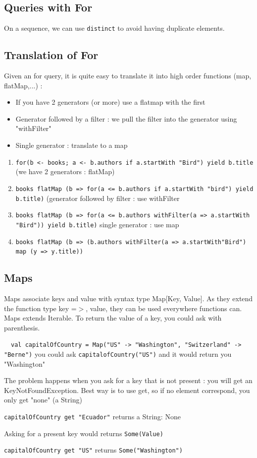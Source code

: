 \documentclass[12pt,a4paper]{article}
\begin{document}
\subsection{Queries with For}
On a sequence, we can use \texttt{distinct} to avoid having duplicate elements.

\subsection{Translation of For}
Given an for query, it is quite easy to translate it into high order functions (map, flatMap,...) :
\begin{itemize}
	\item 	If you have 2 generators (or more) use a flatmap with the first
	\item	Generator followed by a filter : we pull the filter into the generator using "withFilter"
	\item 	Single generator : translate to a map
\end{itemize}

\begin{exemple}
	\begin{enumerate}
		\item 	\texttt{for(b <- books; a <- b.authors if a.startWith "Bird") yield b.title} (we have 2 generators : flatMap)
		\item 	\texttt{books flatMap (b => for(a <= b.authors if a.startWith "bird") yield b.title)} (generator followed by filter : use withFilter
		\item 	\texttt{books flatMap (b => for(a <= b.authors withFilter(a => a.startWith "Bird")) yield b.title)} single generator : use map
		\item 	\texttt{books flatMap (b => (b.authors withFilter(a => a.startWith"Bird") map (y => y.title))} 
	\end{enumerate}
\end{exemple}

\subsection{Maps}
Maps associate keys and value with syntax type Map[Key, Value]. As they extend the function type key =$>$, value, they can be used everywhere functions can. Maps extends Iterable. To return the value of a key, you could ask with parenthesis.
\begin{exemple}~\
	\texttt{val capitalOfCountry = Map("US" -> "Washington", "Switzerland" -> "Berne")} you could ask \texttt{capitalofCountry("US")} and it would return you "Washington"
\end{exemple}
The problem happens when you ask for a key that is not present : you will get an KeyNotFoundException. Best way is to use get, so if no element correspond, you only get "none" (a String)
\begin{exemple}
	\texttt{capitalOfCountry get "Ecuador"} returns a String: None
\end{exemple}
Asking for a present key would returns \texttt{Some(Value)}
\begin{exemple}
	\texttt{capitalOfCountry get "US"} returns \texttt{Some("Washington")}
\end{exemple}
\end{document}
